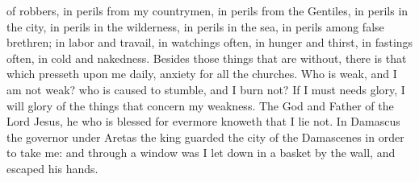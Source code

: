 of robbers, in perils from my countrymen, in perils from the Gentiles, in perils in the city, in perils in the wilderness, in perils in the sea, in perils among false brethren; in labor and travail, in watchings often, in hunger and thirst, in fastings often, in cold and nakedness. Besides those things that are without, there is that which presseth upon me daily, anxiety for all the churches. Who is weak, and I am not weak? who is caused to stumble, and I burn not? If I must needs glory, I will glory of the things that concern my weakness. The God and Father of the Lord Jesus, he who is blessed for evermore knoweth that I lie not. In Damascus the governor under Aretas the king guarded the city of the Damascenes in order to take me: and through a window was I let down in a basket by the wall, and escaped his hands. 


